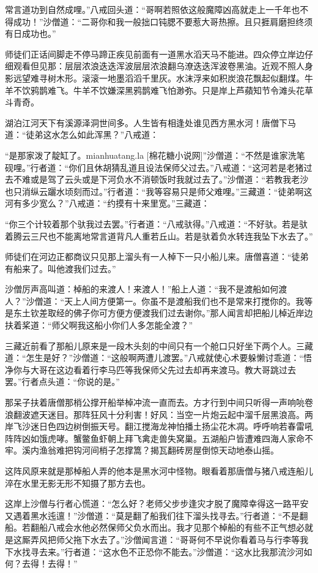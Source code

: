 \documentclass[12pt,UTF8]{ctexbook}
\begin{document}
常言道功到自然成哩。”八戒回头道：“哥啊若照依这般魔障凶高就走上一千年也不得成功！”沙僧道：“二哥你和我一般拙口钝腮不要惹大哥热擦。且只捱肩磨担终须有日成功也。”

师徒们正话间脚走不停马蹄正疾见前面有一道黑水滔天马不能进。四众停立岸边仔细观看但见那：层层浓浪迭迭浑波层层浓浪翻乌潦迭迭浑波卷黑油。近观不照人身影远望难寻树木形。滚滚一地墨滔滔千里灰。水沫浮来如积炭浪花飘起似翻煤。牛羊不饮鸦鹊难飞。牛羊不饮嫌深黑鸦鹊难飞怕渺弥。只是岸上芦蘋知节令滩头花草斗青奇。

湖泊江河天下有溪源泽洞世间多。人生皆有相逢处谁见西方黑水河！唐僧下马道：“徒弟这水怎么如此浑黑？”八戒道：

“是那家泼了靛缸了。mianhuatang.la [棉花糖小说网]”沙僧道：“不然是谁家洗笔砚哩。”行者道：“你们且休胡猜乱道且设法保师父过去。”八戒道：“这河若是老猪过去不难或是驾了云头或是下河负水不消顿饭时我就过去了。”沙僧道：“若教我老沙也只消纵云躧水顷刻而过。”行者道：“我等容易只是师父难哩。”三藏道：“徒弟啊这河有多少宽么？”八戒道：“约摸有十来里宽。”三藏道：

“你三个计较着那个驮我过去罢。”行者道：“八戒驮得。”八戒道：“不好驮。若是驮着腾云三尺也不能离地常言道背凡人重若丘山。若是驮着负水转连我坠下水去了。”

师徒们在河边正都商议只见那上溜头有一人棹下一只小船儿来。唐僧喜道：“徒弟有船来了。叫他渡我们过去。”

沙僧厉声高叫道：棹船的来渡人！来渡人！”船上人道：“我不是渡船如何渡人？”沙僧道：“天上人间方便第一。你虽不是渡船我们也不是常来打搅你的。我等是东土钦差取经的佛子你可方便方便渡我们过去谢你。”那人闻言却把船儿棹近岸边扶着桨道：“师父啊我这船小你们人多怎能全渡？”

三藏近前看了那船儿原来是一段木头刻的中间只有一个舱口只好坐下两个人。三藏道：“怎生是好？”沙僧道：“这般啊两遭儿渡罢。”八戒就使心术要躲懒讨乖道：“悟净你与大哥在这边看着行李马匹等我保师父先过去却再来渡马。教大哥跳过去罢。”行者点头道：“你说的是。”

那呆子扶着唐僧那梢公撑开船举棹冲流一直而去。方才行到中间只听得一声响喨卷浪翻波遮天迷目。那阵狂风十分利害！好风：当空一片炮云起中溜千层黑浪高。两岸飞沙迷日色四边树倒振天号。翻江搅海龙神怕播土扬尘花木凋。呼呼响若春雷吼阵阵凶如饿虎哮。蟹鳖鱼虾朝上拜飞禽走兽失窝巢。五湖船户皆遭难四海人家命不牢。溪内渔翁难把钩河间梢子怎撑篙？揭瓦翻砖房屋倒惊天动地泰山摇。

这阵风原来就是那棹船人弄的他本是黑水河中怪物。眼看着那唐僧与猪八戒连船儿淬在水里无影无形不知摄了那方去也。

这岸上沙僧与行者心慌道：“怎么好？老师父步步逢灾才脱了魔障幸得这一路平安又遇着黑水迍邅！”沙僧道：“莫是翻了船我们往下溜头找寻去。”行者道：“不是翻船。若翻船八戒会水他必然保师父负水而出。我才见那个棹船的有些不正气想必就是这厮弄风把师父拖下水去了。”沙僧闻言道：“哥哥何不早说你看着马与行李等我下水找寻去来。”行者道：“这水色不正恐你不能去。”沙僧道：“这水比我那流沙河如何？去得！去得！”
\end{document}
